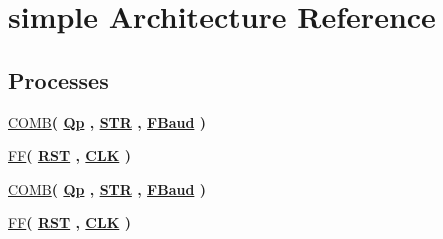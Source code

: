 \hypertarget{class_fsm_write_1_1simple}{}\section{simple Architecture Reference}
\label{class_fsm_write_1_1simple}
\subsection*{Processes}
 \begin{DoxyCompactItemize}
\item 
\hyperlink{class_fsm_write_1_1simple_a679f645b58f799581c106ca494a4953b}{C\+O\+M\+B}{\bfseries  ( {\bfseries {\bfseries \hyperlink{class_fsm_write_1_1simple_a1374ca621da8c3ce3b11dc3a52dec0cf}{Qp}} \textcolor{vhdlchar}{ }} , {\bfseries {\bfseries \hyperlink{class_fsm_write_a2362aafea593a78b601ede05bb71edd7}{S\+T\+R}} \textcolor{vhdlchar}{ }} , {\bfseries {\bfseries \hyperlink{class_fsm_write_af29ebfe43178ab3fe4bfeb0538c18d1f}{F\+Baud}} \textcolor{vhdlchar}{ }} )}
\item 
\hyperlink{class_fsm_write_1_1simple_a596f3c3b24f9699291119d701202e7d2}{F\+F}{\bfseries  ( {\bfseries {\bfseries \hyperlink{class_fsm_write_a98682ef7de2714e5bab788a2e2ff1b7f}{R\+S\+T}} \textcolor{vhdlchar}{ }} , {\bfseries {\bfseries \hyperlink{class_fsm_write_ab5d0ea9e968d49d94da9db07a979d402}{C\+L\+K}} \textcolor{vhdlchar}{ }} )}
\item 
\hyperlink{class_fsm_write_1_1simple_a679f645b58f799581c106ca494a4953b}{C\+O\+M\+B}{\bfseries  ( {\bfseries {\bfseries \hyperlink{class_fsm_write_1_1simple_a1374ca621da8c3ce3b11dc3a52dec0cf}{Qp}} \textcolor{vhdlchar}{ }} , {\bfseries {\bfseries \hyperlink{class_fsm_write_a2362aafea593a78b601ede05bb71edd7}{S\+T\+R}} \textcolor{vhdlchar}{ }} , {\bfseries {\bfseries \hyperlink{class_fsm_write_af29ebfe43178ab3fe4bfeb0538c18d1f}{F\+Baud}} \textcolor{vhdlchar}{ }} )}
\item 
\hyperlink{class_fsm_write_1_1simple_a596f3c3b24f9699291119d701202e7d2}{F\+F}{\bfseries  ( {\bfseries {\bfseries \hyperlink{class_fsm_write_a98682ef7de2714e5bab788a2e2ff1b7f}{R\+S\+T}} \textcolor{vhdlchar}{ }} , {\bfseries {\bfseries \hyperlink{class_fsm_write_ab5d0ea9e968d49d94da9db07a979d402}{C\+L\+K}} \textcolor{vhdlchar}{ }} )}
\end{DoxyCompactItemize}
